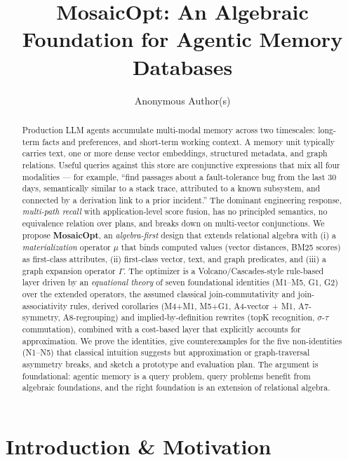\documentclass[acmsmall,review,anonymous]{acmart}
\title{MosaicOpt: An Algebraic Foundation for Agentic Memory Databases}
\author{Anonymous Author(s)}
\affiliation{
  \institution{Anonymous Institution}
  \city{Anonymous City}
  \state{Anonymous State}
  \country{Anonymous Country}}
\theoremstyle{plain}
\theoremstyle{definition}
\theoremstyle{remark}
\begin{document}
\begin{abstract}
\noindent
Production LLM agents accumulate multi-modal memory across two timescales:
long-term facts and preferences, and short-term working context. A memory
unit typically carries text, one or more dense vector embeddings,
structured metadata, and graph relations. Useful queries against this
store are conjunctive expressions that mix all four modalities --- for
example, ``find passages about a fault-tolerance bug from the last 30
days, semantically similar to a stack trace, attributed to a known
subsystem, and connected by a derivation link to a prior incident.'' The
dominant engineering response, \emph{multi-path recall} with
application-level score fusion, has no principled semantics, no
equivalence relation over plans, and breaks down on multi-vector
conjunctions. We propose \textbf{MosaicOpt}, an \emph{algebra-first}
design that extends relational algebra with (i) a \emph{materialization}
operator $\mu$ that binds computed values (vector distances, BM25
scores) as first-class attributes, (ii) first-class vector, text, and
graph predicates, and (iii) a graph expansion operator $\Gamma$. The
optimizer is a Volcano/Cascades-style rule-based layer driven by an
\emph{equational theory} of seven foundational identities (M1--M5, G1,
G2) over the extended operators, the assumed classical
join-commutativity and join-associativity rules, derived corollaries
(M4+M1, M5+G1, A4-vector + M1, A7-symmetry, A8-regrouping) and
implied-by-definition rewrites (topK recognition, $\sigma$-$\tau$
commutation), combined with a cost-based layer that explicitly accounts
for approximation. We prove the identities, give counterexamples for
the five non-identities (N1--N5) that classical intuition suggests but
approximation or graph-traversal asymmetry breaks, and sketch a
prototype and evaluation plan. The argument is foundational: agentic
memory is a query problem, query problems benefit from algebraic
foundations, and the right foundation is an extension of relational
algebra.
\end{abstract}

\maketitle

\section{Introduction \& Motivation}\label{sec:intro}
\end{document}
